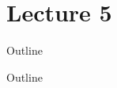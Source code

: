 \documentclass{beamer}
\begin{document}
\part{Lecture 5}

\begin{frame}
	\titlepage
	\resetonslide
\end{frame}






\begin{frame}{Outline}
	\tableofcontents[part=5]
\end{frame}
\begin{frame}{Outline}
	\tableofcontents[part=5]
\end{frame}
\end{document}

